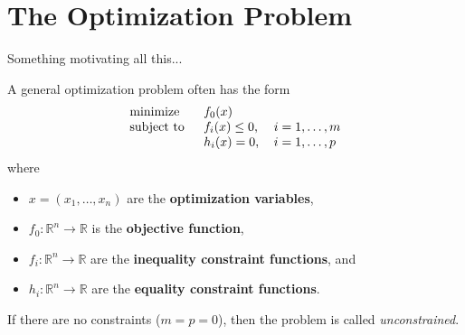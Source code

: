 \section{The Optimization Problem}

Something motivating all this...

A general {\color{tiananmen}optimization problem} often has the form
\begin{equation}
	\begin{tabular}{lll}
		\text{minimize }   & $f_0(x)$          & \\
		\text{subject to } & $f_i(x)\leq 0$, & $i=1,\ldots, m$\\
		& $h_i(x) = 0$,      & $i=1,\ldots, p$
	\end{tabular}\label{Optimization}
\end{equation}
where
\begin{itemize}
	\item {\color{baystate} $x=\left(x_1,\ldots,x_n\right)$} are the {\color{tiananmen} \textbf{optimization variables}},
	\item {\color{baystate} $f_0 : \mathbb{R}^n\rightarrow\mathbb{R}$} is the {\color{tiananmen} \textbf{objective function}},
	\item {\color{baystate} $f_i : \mathbb{R}^n\rightarrow\mathbb{R}$} are the {\color{tiananmen} \textbf{inequality constraint functions}}, and
	\item {\color{baystate} $h_i : \mathbb{R}^n\rightarrow\mathbb{R}$} are the {\color{tiananmen}\textbf{equality constraint functions}}.
\end{itemize}

If there are no constraints ($m=p=0$), then the problem is called {\color{tiananmen}\textit{unconstrained}}.